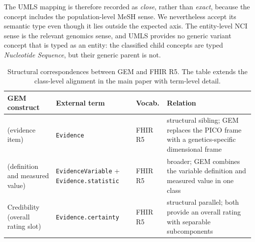 The UMLS mapping is therefore recorded as \emph{close}, rather than
\emph{exact}, because the concept includes the population-level MeSH sense.
We nevertheless accept its semantic type even though it lies outside the
expected axis. The entity-level NCI sense is the relevant genomics sense,
and UMLS provides no generic variant concept that is typed as an entity:
the classified child concepts are typed \emph{Nucleotide Sequence}, but
their generic parent is not.

\begin{table}[H]
  \centering
  \small
  \caption[Crosswalk: structural classes]{Structural correspondences between
  GEM and FHIR R5. The table extends the class-level alignment in the main
  paper with term-level detail.}
  \label{tab:xwalk-structural}
  \begin{tabularx}{\linewidth}{@{}>{\raggedright\arraybackslash}X >{\raggedright\arraybackslash}X l >{\raggedright\arraybackslash}X@{}}
    \toprule
    GEM construct & External term & Vocab. & Relation \\
    \midrule
        \ScientificEvidence{} (evidence item) & \texttt{Evidence} & FHIR R5 & structural sibling; GEM replaces the PICO frame with a genetics-specific dimensional frame \\
        \EvidenceVariable{} (definition and measured value) & \texttt{EvidenceVariable} + \texttt{Evidence.statistic} & FHIR R5 & broader; GEM combines the variable definition and measured value in one class \\
        Credibility (overall rating slot) & \texttt{Evidence.certainty} & FHIR R5 & structural parallel; both provide an overall rating with separable subcomponents \\
    \bottomrule
  \end{tabularx}
\end{table}

